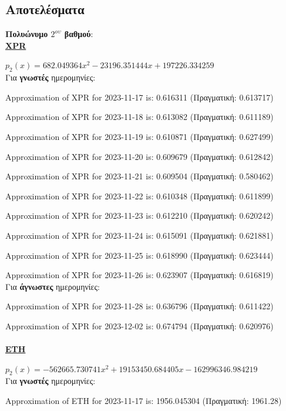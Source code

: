 \documentclass[a4paper, 14pt]{article}   %
\begin{document}
\subsection*{Αποτελέσματα}   %
\textbf{Πολυώνυμο $2^{ου}$ βαθμού}:\\

\textbf{\underline{XPR}}

$p_2(x) = 682.049364x^2 - 23196.351444x + 197226.334259$\\

Για \textbf{γνωστές} ημερομηνίες:

Approximation of XPR for 2023-11-17 is: 0.616311 \small{(Πραγματική: 0.613717)}

Approximation of XPR for 2023-11-18 is: 0.613082 \small{(Πραγματική: 0.611189)}

Approximation of XPR for 2023-11-19 is: 0.610871 \small{(Πραγματική: 0.627499)}

Approximation of XPR for 2023-11-20 is: 0.609679 \small{(Πραγματική: 0.612842)}

Approximation of XPR for 2023-11-21 is: 0.609504 \small{(Πραγματική: 0.580462)}

Approximation of XPR for 2023-11-22 is: 0.610348 \small{(Πραγματική: 0.611899)}

Approximation of XPR for 2023-11-23 is: 0.612210 \small{(Πραγματική: 0.620242)}

Approximation of XPR for 2023-11-24 is: 0.615091 \small{(Πραγματική: 0.621881)}

Approximation of XPR for 2023-11-25 is: 0.618990 \small{(Πραγματική: 0.623444)}

Approximation of XPR for 2023-11-26 is: 0.623907 \small{(Πραγματική: 0.616819)}\\

Για \textbf{άγνωστες} ημερομηνίες:

Approximation of XPR for 2023-11-28 is: 0.636796 \small{(Πραγματική: 0.611422)}

Approximation of XPR for 2023-12-02 is: 0.674794 \small{(Πραγματική: 0.620976)}\\\\

\textbf{\underline{ETH}}

$p_2(x) = -562665.730741x^2 + 19153450.684405x - 162996346.984219$\\

Για \textbf{γνωστές} ημερομηνίες:

Approximation of ETH for 2023-11-17 is: 1956.045304 \small{(Πραγματική: 1961.28)}
\end{document}

